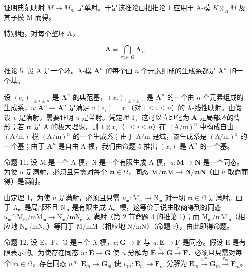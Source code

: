 证明典范映射 \(M \rightarrow M_{m}\) 是单射。于是该推论由把推论 1 应用于 A-模 \(K \otimes_{A} M\) 及其子模 M 而得。

特别地，对每个整环 A，

\[
\mathbf {A} = \bigcap_ {\mathfrak {m} \in \Omega} \mathbf {A} _ {\mathfrak {m}}.\tag{2}
\]

推论 5. 设 A 是一个环。A-模 \(\mathbf{A}^n\) 的每个由 \(n\) 个元素组成的生成系都是 \(\mathbf{A}^n\) 的一个基。

设 \((e_i)_{1\leqslant i\leqslant n}\) 是 \(\mathbf{A}^n\) 的典范基，\((x_i)_{1\leqslant i\leqslant n}\) 是 \(\mathbf{A}^n\) 的一个由 \(n\) 个元素组成的生成系，\(u\colon \mathbf{A}^n\to \mathbf{A}^n\) 是满足 \(u(e_i) = x_i\)（对 \(1\leqslant i\leqslant n\)）的 A-线性映射。由假设 \(u\) 是满射，需要证明 \(u\) 是单射。凭定理 1，这可以立即化为 \(\mathbf{A}\) 是局部环的情形；若 \(\mathfrak{m}\) 是 \(\mathbf{A}\) 的极大理想，则 \(1\otimes x_i\)（\(1\leqslant i\leqslant n\)）在 \((\mathrm{A / m})^n\) 中构成自由 \((\mathrm{A / m})\)-模 \((\mathrm{A / m})^n\) 的一个生成系；由于 \(\mathrm{A / m}\) 是域，该生成系是 \((\mathrm{A / m})^n\) 的一个基；由于 \(\mathbf{A}^n\) 是自由 A-模，我们由命题 5 推出 \((x_i)\) 是 \(\mathbf{A}^n\) 的一个基。

命题 11. 设 M 是一个 A-模，N 是一个有限生成 A-模，\(u: \mathbf{M} \to \mathbf{N}\) 是一个同态。为使 \(u\) 是满射，必须且只需对每个 \(\mathfrak{m} \in \Omega\)，同态 \(\mathbf{M} / \mathfrak{m}\mathbf{M} \to \mathbf{N} / \mathfrak{m}\mathbf{N}\)（由 \(u\) 取商而得）是满射。

由定理 1，为使 \(u\) 是满射，必须且只需 \(u_{\mathfrak{m}}: \mathrm{M}_{\mathfrak{m}} \to \mathrm{N}_{\mathfrak{m}}\) 对一切 \(\mathfrak{m} \in \Omega\) 是满射。由于 \(\mathrm{A}_{\mathfrak{m}}\) 是局部环且 \(\mathrm{N}_{\mathfrak{m}}\) 是有限生成 \(\mathrm{A}_{\mathfrak{m}}\)-模，这等价于说由取商得到的同态 \(u_{\mathfrak{m}}': \mathrm{M}_{\mathfrak{m}} / \mathrm{mM}_{\mathfrak{m}} \to \mathrm{N}_{\mathfrak{m}} / \mathrm{mN}_{\mathfrak{m}}\) 是满射（第 2 节命题 4 的推论 1）；而 \(\mathrm{M}_{\mathfrak{m}} / \mathrm{mM}_{\mathfrak{m}}\)（相应地 \(\mathrm{N}_{\mathfrak{m}} / \mathrm{mN}_{\mathfrak{m}}\)）等同于 \(\mathrm{M} / \mathrm{mM}\)（相应地 \(\mathrm{N} / \mathrm{mN}\)）（命题 9），由此即得命题。

命题 12. 设 E、F、G 是三个 A-模，\(v: \mathbf{G} \to \mathbf{F}\) 与 \(u: \mathbf{E} \to \mathbf{F}\) 是同态。假设 E 是有限表示的。为使存在同态 \(w: \mathbf{E} \to \mathbf{G}\) 使 \(u\) 分解为 \(\mathbf{E} \xrightarrow{w} \mathbf{G} \xrightarrow{v} \mathbf{F}\)，必须且只需对每个 \(m \in \Omega\)，存在同态 \(w^m: \mathbf{E}_m \to \mathbf{G}_m\) 使 \(u_m: \mathbf{E}_m \to \mathbf{F}_m\) 分解为 \(\mathbf{E}_m \xrightarrow{w^m} \mathbf{G}_m \xrightarrow{v_m} \mathbf{F}_m\)。


